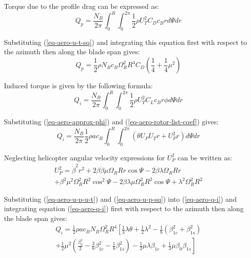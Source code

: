 Torque due to the profile drag can be expressed as: \cite{Bramwell2001}
\begin{equation}
  Q_p = \frac{N_B}{2\pi}
  \int_{0}^{R} \int_{0}^{2\pi} \frac{1}{2} \rho U_T^2 C_D c_B r d \Psi dr
\end{equation}

Substituting (\ref{eq-aero-u-t-sq}) and integrating this equation first with respect to the azimuth then along the blade span gives:
\begin{equation}
  Q_p = \frac{1}{2} \rho N_B c_B \Omega_R^2 R^4 C_D
  \left( \frac{1}{4} + \frac{1}{4} \mu^2 \right)
\end{equation}

Induced torque is given by the following formula: \cite{Bramwell2001}
\begin{equation}
  Q_i = \frac{N_B}{2\pi} \int_{0}^{R} \int_{0}^{2\pi}
  \frac{1}{2} \rho U_T^2 C_L c_B r \phi d \Psi dr
\end{equation}

Substituting (\ref{eq-aero-approx-phi}) and (\ref{eq-aero-rotor-list-coef}) gives:
\begin{equation}
  \label{eq-aero-q-i}
  Q_i = \frac{N_B}{2\pi} \frac{1}{2} \rho a c_B
  \int_{0}^{R} \int_{0}^{2\pi}
  \left( \theta U_P U_T r + U_P^2 r \right) d \Psi dr
\end{equation}

Neglecting helicopter angular velocity expressions for $U_P^2$ can be written as:
\begin{multline}
  \label{eq-aero-u-p-sq}
  U_P^2 = \dot \beta^2 r^2
  + 2 \beta \dot \beta \mu \Omega_R R r \cos \Psi
  - 2 \dot \beta \lambda \Omega_R R r \\
  + \beta^2 \mu^2 \Omega_R^2 R^2 \cos^2 \Psi
  - 2 \beta \lambda \mu \Omega_R^2 R^2 \cos \Psi
  + \lambda^2 \Omega_R^2 R^2
\end{multline}

Substituting (\ref{eq-aero-u-p-u-t}) and (\ref{eq-aero-u-p-sq}) into (\ref{eq-aero-q-i}) and integrating equation (\ref{eq-aero-q-i}) first with respect to the azimuth then along the blade span gives:
\begin{multline}
Q_i = \frac{1}{2} \rho a c_B N_B \Omega_R^2 R^4
\left[
    \frac{1}{3} \lambda \theta
  + \frac{1}{2} \lambda^2
  - \frac{1}{8} \left( \beta_{1c}^2 + \beta_{1s}^2 \right)
  \right.
  \\
  \left.
  + \frac{1}{2} \mu^2
  \left(
    \frac{\beta_0^2}{2}
    - \frac{3}{8} \beta_{1c}^2
    - \frac{1}{8} \beta_{1s}^2
  \right)
  - \frac{1}{2} \mu \lambda \beta_{1c}
  + \frac{1}{3} \mu \beta_0 \beta_{1s}
\right]
\end{multline}

